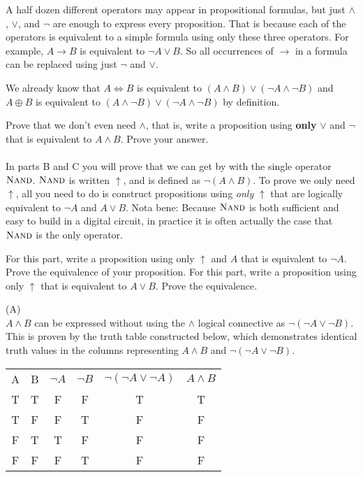 \documentclass[solution,letterpaper]{cs20}
\begin{document}


\begin{problem}
A half dozen different operators may appear in propositional formulas, but just
$\wedge$, $\vee$, and $\neg$ are enough to express every proposition. That is because each of the operators
is equivalent to a simple formula using only these three operators. For example,
$A \rightarrow B$ is equivalent to $\neg A \vee B$. So all occurrences of $\rightarrow$ in a
formula can be replaced using just $\neg$ and $\vee$.

We already know that $A \iff B$ is equivalent to $(A \land B) \lor (\neg A \land \neg B)$ and $A \oplus B$ is equivalent to $(A \land \neg B) \lor (\neg A \land \neg B)$ by definition.

\subproblem Prove that we don’t even need $\wedge$, that is, write a proposition using {\bf only} $\vee$ and $\neg$ that is equivalent to $A \wedge B$. Prove your answer. \\ \\
In parts B and C you will prove that we can get by with the single operator $\textsc{Nand}$. $\textsc{Nand}$ is written $\uparrow$, and is defined as $\neg(A \wedge B)$. To prove we only need $\uparrow$, all you need to do is construct propositions using \emph{only} $\uparrow$ that are logically equivalent to $\neg A$ and $A \vee B$. Nota bene: Because $\textsc{Nand}$ is both sufficient and easy to build in a digital circuit, in practice it is often actually the case that $\textsc{Nand}$ is the only operator.

\subproblem For this part, write a proposition using only $\uparrow$ and $A$ that is equivalent to $\neg A$. Prove the equivalence of your proposition.
\subproblem For this part, write a proposition using only $\uparrow$ that is equivalent to $A \vee B$. Prove the equivalence.


\begin{solution}
    (A) \\
    $A \land B$ can be expressed without using the $\land$ logical connective as $\neg (\neg A \lor \neg B)$. This is proven by the truth table constructed below, which demonstrates identical truth values in the columns representing $A \land B$ and $\neg (\neg A \lor \neg B)$.

    \begin{tabular}{c|c|c|c|c|c|}
        A & B & $\neg A$ & $\neg B$ & $\neg (\neg A \lor \neg A)$ & $A \land B$ \\
        T & T & F & F & T & T  \\
        T & F & F & T & F & F  \\
        F & T & T & F & F & F  \\
        F & F & F & T & F & F  \\
    \end{tabular}
    \label{tab:my_label} \\


\end{solution}
\end{problem}
\end{document}

